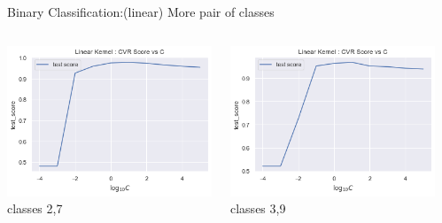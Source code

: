 \documentclass[12pt,t]{beamer}
\begin{document}
\begin{frame}[t]{Binary Classification:(linear) More pair of classes}
\scriptsize
\begin{columns}
    \begin{column}[]{0.25\linewidth}
        \includegraphics[width=\linewidth]{images/p1a/2(binary clf)/classes2and7_libsvm_linear25f.png}
        \centering classes 2,7
    \end{column}
    \begin{column}[]{0.25\linewidth}
        \includegraphics[width=\linewidth]{images/p1a/2(binary clf)/classes3and9_libsvm_linear25f.png}
        \centering classes 3,9
    \end{column}
    \begin{column}[]{0.25\linewidth}

\end{column}
\end{columns}
\end{frame}
\end{document}
